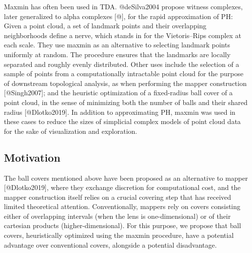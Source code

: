 \documentclass[
]{article}
\begin{document}
Maxmin has often been used in TDA. @deSilva2004 propose witness
complexes, later generalized to alpha complexes {[}@{]}, for the rapid
approximation of PH: Given a point cloud, a set of landmark points and
their overlapping neighborhoods define a nerve, which stands in for the
Vietoris--Rips complex at each scale. They use maxmin as an alternative
to selecting landmark points uniformly at random. The procedure ensures
that the landmarks are locally separated and roughly evenly distributed.
Other uses include the selection of a sample of points from a
computationally intractable point cloud for the purpose of downstream
topological analysis, as when performing the mapper construction
{[}@Singh2007{]}; and the heuristic optimization of a fixed-radius ball
cover of a point cloud, in the sense of minimizing both the number of
balls and their shared radius {[}@Dlotko2019{]}. In addition to
approximating PH, maxmin was used in these cases to reduce the sizes of
simplicial complex models of point cloud data for the sake of
visualization and exploration.

\hypertarget{motivation}{%
\subsection{Motivation}\label{motivation}}

The ball covers mentioned above have been proposed as an alternative to
mapper {[}@Dlotko2019{]}, where they exchange discretion for
computational cost, and the mapper construction itself relies on a
crucial covering step that has received limited theoretical attention.
Conventionally, mappers rely on covers consisting either of overlapping
intervals (when the lens is one-dimensional) or of their cartesian
products (higher-dimensional). For this purpose, we propose that ball
covers, heuristically optimized using the maxmin procedure, have a
potential advantage over conventional covers, alongside a potential
disadvantage.
\end{document}
